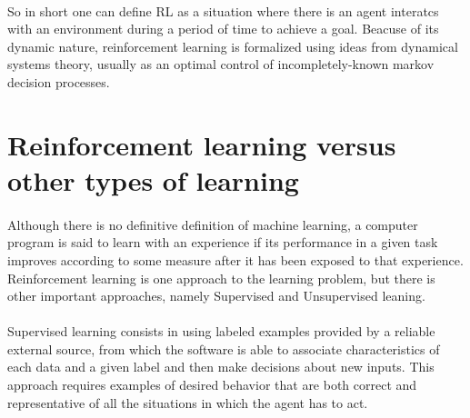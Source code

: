 \documentclass{article}
\begin{document}
\paragraph{}
So in short one can define RL as a situation where there is an agent interatcs with an environment during a period of time to achieve a goal. Beacuse of its dynamic nature, reinforcement learning is formalized using ideas from dynamical systems theory, usually as an optimal control of incompletely-known markov decision processes.

\section{Reinforcement learning versus other types of learning}
\paragraph{}
Although there is no definitive definition of machine learning, a computer program is said to learn with an experience if its performance in a given task improves according to some measure after it has been exposed to that experience. Reinforcement learning is one approach to the learning problem, but there is other important approaches, namely Supervised and Unsupervised leaning.

\paragraph{}
Supervised learning consists in using labeled examples provided by a reliable external source, from which the software is able to associate characteristics of each data and a given label and then make decisions about new inputs. This approach requires examples of desired behavior that are both correct and representative of all the situations in which the agent has to act.
\end{document}

